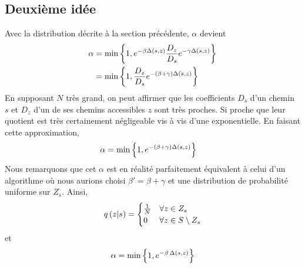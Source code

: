 \documentclass[a4paper, 12pt]{report}
\begin{document}
    \subsection{Deuxième idée}
    Avec la distribution décrite à la section précédente, $\alpha$ devient
    \begin{align*}
        \alpha & = \min \left\{1, e^{-\beta \Delta(s, z)} \frac{D_z}{D_s} e^{-\gamma \Delta(s, z)}\right\} \\
        & = \min \left\{1, \frac{D_z}{D_s} e^{-(\beta + \gamma) \Delta(s, z)}\right\}
    \end{align*}
    En supposant $N$ très grand, on peut affirmer que les coefficients $D_s$ d'un chemin $s$ et $D_z$ d'un de ses chemins accessibles $z$ sont très proches. Si proche que leur quotient est très certainement négligeable vis à vis d'une exponentielle. En faisant cette approximation,
    \begin{align*}
        \alpha & = \min \left\{1, e^{-(\beta + \gamma) \Delta(s, z)}\right\}
    \end{align*}
    Nous remarquons que cet $\alpha$ est en réalité parfaitement équivalent à celui d'un algorithme où nous aurions choisi $\beta' = \beta + \gamma$ et une distribution de probabilité uniforme sur $Z_s$.
    Ainsi,
    \begin{equation}
        q\left(z | s\right) =
        \begin{cases}
            \frac{1}{N} & \forall z \in Z_s \\
            0 & \forall z \in S \setminus Z_s
        \end{cases}
    \end{equation}
    et
    \begin{equation} \label{eq:alpha}
        \alpha = \min \left\{1, e^{-\beta \, \Delta(s, z)}\right\}
    \end{equation}
\end{document}
